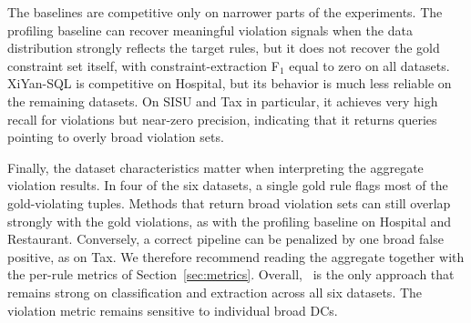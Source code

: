 The baselines are competitive only on narrower parts of the experiments. The profiling baseline can recover meaningful violation signals when the data distribution strongly reflects the target rules, but it does not recover the gold
constraint set itself, with constraint-extraction F$_1$ equal to zero on all datasets. XiYan-SQL is competitive on Hospital, but its behavior is much less reliable on the remaining datasets. On SISU and Tax in particular, it achieves very high recall for violations but near-zero precision, indicating that it returns queries pointing to overly broad violation sets.

Finally, the dataset characteristics matter when interpreting the aggregate
violation results. In four of the six datasets, a single gold rule flags most of
the gold-violating tuples. Methods that return broad violation sets can still overlap strongly
with the gold violations, as with the profiling baseline on Hospital and
Restaurant. Conversely, a correct pipeline can be penalized by one broad false
positive, as on Tax. We therefore recommend reading the aggregate together with
the per-rule metrics of Section~\ref{sec:metrics}.
Overall, \system\ is the only approach that remains strong on classification and extraction across all six datasets. The violation metric remains sensitive to individual broad DCs.



